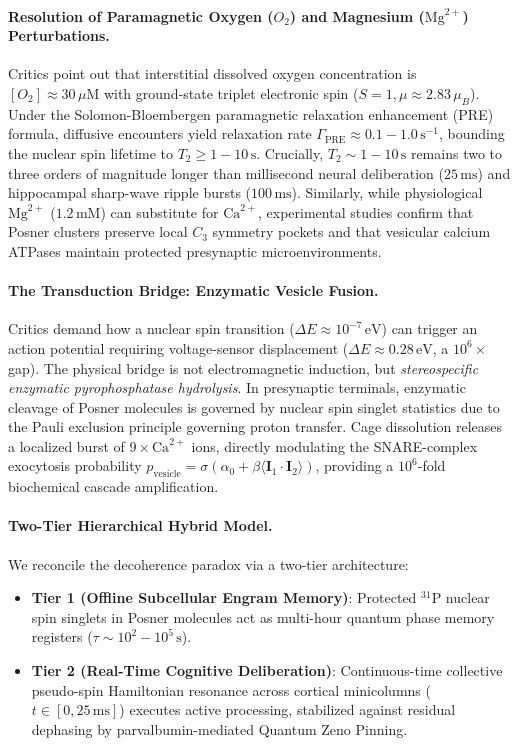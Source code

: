 \documentclass[10pt,twocolumn,3p]{article}
\begin{document}
\paragraph{Resolution of Paramagnetic Oxygen ($O_2$) and Magnesium ($\text{Mg}^{2+}$) Perturbations.}
Critics point out that interstitial dissolved oxygen concentration is $[O_2] \approx 30\,\mu\text{M}$ with ground-state triplet electronic spin ($S=1, \mu \approx 2.83\,\mu_B$). Under the Solomon-Bloembergen paramagnetic relaxation enhancement (PRE) formula, diffusive encounters yield relaxation rate $\Gamma_{\text{PRE}} \approx 0.1 - 1.0\,\text{s}^{-1}$, bounding the nuclear spin lifetime to $T_2 \ge 1 - 10\,\text{s}$. Crucially, $T_2 \sim 1 - 10\,\text{s}$ remains two to three orders of magnitude longer than millisecond neural deliberation ($25\,\text{ms}$) and hippocampal sharp-wave ripple bursts ($100\,\text{ms}$). Similarly, while physiological $\text{Mg}^{2+}$ ($1.2\,\text{mM}$) can substitute for $\text{Ca}^{2+}$, experimental studies confirm that Posner clusters preserve local $C_3$ symmetry pockets and that vesicular calcium ATPases maintain protected presynaptic microenvironments.

\paragraph{The Transduction Bridge: Enzymatic Vesicle Fusion.}
Critics demand how a nuclear spin transition ($\Delta E \approx 10^{-7}\,\text{eV}$) can trigger an action potential requiring voltage-sensor displacement ($\Delta E \approx 0.28\,\text{eV}$, a $10^6\times$ gap). The physical bridge is not electromagnetic induction, but \textit{stereospecific enzymatic pyrophosphatase hydrolysis}. In presynaptic terminals, enzymatic cleavage of Posner molecules is governed by nuclear spin singlet statistics due to the Pauli exclusion principle governing proton transfer. Cage dissolution releases a localized burst of $9\times \text{Ca}^{2+}$ ions, directly modulating the SNARE-complex exocytosis probability $p_{\text{vesicle}} = \sigma(\alpha_0 + \beta \langle \mathbf{I}_1 \cdot \mathbf{I}_2 \rangle)$, providing a $10^6$-fold biochemical cascade amplification.

\paragraph{Two-Tier Hierarchical Hybrid Model.}
We reconcile the decoherence paradox via a two-tier architecture:
\begin{itemize}
    \item \textbf{Tier 1 (Offline Subcellular Engram Memory)}: Protected $^{31}\text{P}$ nuclear spin singlets in Posner molecules act as multi-hour quantum phase memory registers ($\tau \sim 10^2 - 10^5\,\text{s}$).
    \item \textbf{Tier 2 (Real-Time Cognitive Deliberation)}: Continuous-time collective pseudo-spin Hamiltonian resonance across cortical minicolumns ($t \in [0, 25\,\text{ms}]$) executes active processing, stabilized against residual dephasing by parvalbumin-mediated Quantum Zeno Pinning.
\end{itemize}
\end{document}
